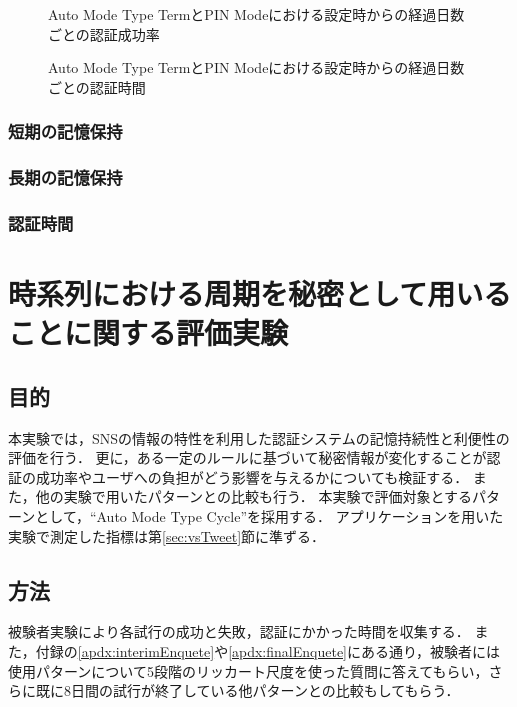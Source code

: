 \begin{figure}[ht]
  \begin{center}
  \end{center}
  \caption{Auto Mode Type TermとPIN Modeにおける設定時からの経過日数ごとの認証成功率}
  \label{fig:ex_auto_term_vs_pin_rate}
\end{figure}

\begin{figure}[ht]
  \begin{center}
  \end{center}
  \caption{Auto Mode Type TermとPIN Modeにおける設定時からの経過日数ごとの認証時間}
  \label{fig:ex_auto_term_vs_pin_time}
\end{figure}

\subsubsection{短期の記憶保持}


\subsubsection{長期の記憶保持}


\subsubsection{認証時間}


\section{時系列における周期を秘密として用いることに関する評価実験}\label{sec:vsCycle}
\subsection{目的}
本実験では，SNSの情報の特性を利用した認証システムの記憶持続性と利便性の評価を行う．
更に，ある一定のルールに基づいて秘密情報が変化することが認証の成功率やユーザへの負担がどう影響を与えるかについても検証する．
また，他の実験で用いたパターンとの比較も行う．
本実験で評価対象とするパターンとして，``Auto Mode Type Cycle''を採用する．
アプリケーションを用いた実験で測定した指標は第\ref{sec:vsTweet}節に準ずる．

\subsection{方法}
被験者実験により各試行の成功と失敗，認証にかかった時間を収集する．
また，付録の\ref{apdx:interimEnquete}や\ref{apdx:finalEnquete}にある通り，被験者には使用パターンについて5段階のリッカート尺度を使った質問に答えてもらい，さらに既に8日間の試行が終了している他パターンとの比較もしてもらう．

